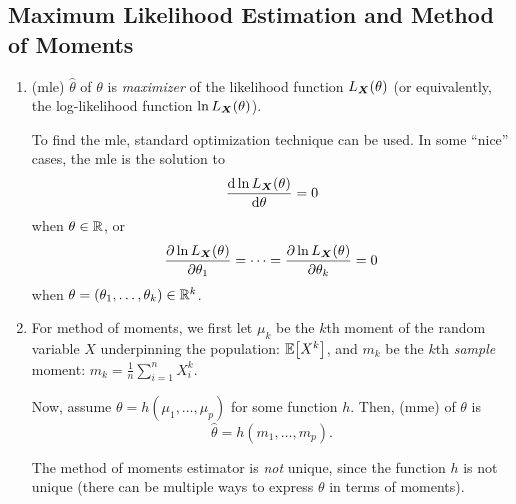 \subsection{Maximum Likelihood Estimation and Method of Moments}
\begin{enumerate}
\item {} (mle) \(\widehat{\theta}\) of
\(\theta\) is \emph{maximizer} of the likelihood function
\(L_{\vb*{X}}\qty(\theta)\) (or equivalently, the log-likelihood function
\(\ln L_{\vb*{X}}\qty(\theta)\)).

\begin{note}
To find the mle, standard optimization technique can be used. In some ``nice''
cases, the mle is the solution to
\[
\dv{\ln L_{\vb*{X}}\qty(\theta)}{\theta}=0
\]
when \(\theta\in\mathbb{R}\), or 
\[
\pdv{\ln L_{\vb*{X}}\qty(\theta)}{\theta_1}=\dotsb=\pdv{\ln L_{\vb*{X}}\qty(\theta)}{\theta_k}=0
\]
when \(\theta=(\theta_1,\dotsc,\theta_k)\in\mathbb{R}^k\).
\end{note}
\item For method of moments, we first let \(\mu_k\) be the \(k\)th moment of
the random variable \(X\) underpinning the population: \(\mathbb{E}\qty[X^k]\), and
\(m_k\) be the \(k\)th \emph{sample} moment: \(m_k=\frac{1}{n}\sum_{i=1}^{n}X_i^{k}\).

Now, assume \(\theta=h(\mu_1,\dotsc,\mu_p)\) for some function \(h\). Then,
 (mme) of \(\theta\) is
\[
\widehat{\theta}=h(m_1,\dotsc,m_p).
\]
\begin{note}
The method of moments estimator is \emph{not} unique, since the function \(h\)
is not unique (there can be multiple ways to express \(\theta\) in terms of
moments).
\end{note}
\end{enumerate}

